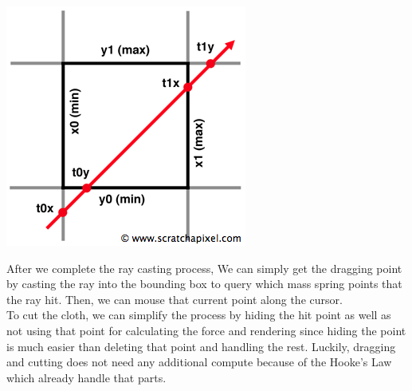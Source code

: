 \documentclass{article}
\begin{document}
\begin{multicols}{2}
\centering
\includegraphics[scale = 0.4]{RayAABB}\newline

\justifying
After we complete the ray casting process, We can simply get the dragging point by casting the ray into the bounding box to query which mass spring points that the ray hit. Then, we can mouse that current point along the cursor.\\
\indent To cut the cloth, we can simplify the process by hiding the hit point as well as not using that point for calculating the force and rendering since hiding the point is much easier than deleting that point and handling the rest. Luckily, dragging and cutting does not need any additional compute because of the Hooke's Law which already handle that parts.\newline


\end{multicols}
\end{document}
